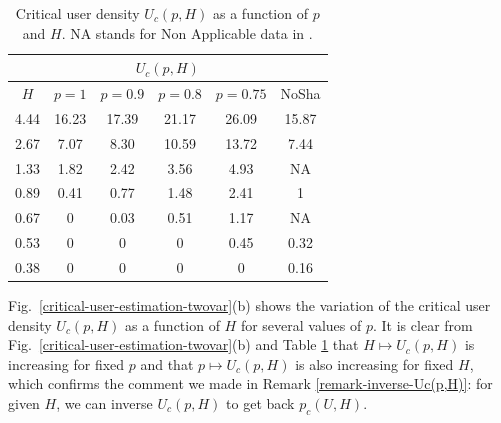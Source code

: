 \documentclass[conference]{IEEEtran}
\begin{document}
\begin{table}[t!]
\caption{Critical user density $U_{c}(p,H)$ as a function of $p$ and $H$. NA stands for Non Applicable data in \cite{cali2018percolation}.} 
\begin{center}
\begin{tabular}{|c|c|c|c|c|c|}
\hline
\multicolumn{6}{|c|}{$U_c(p,H)$}\\
\hline
$H$ & $p=1$ & $p=0.9$ & $p=0.8$ & $p=0.75$ & NoSha \cite{cali2018percolation} \\
\hline
4.44 & 16.23 & 17.39 & 21.17  & 26.09 & 15.87 \\
2.67 & 7.07  & 8.30 & 10.59 & 13.72 &  7.44 \\
1.33 & 1.82 & 2.42 & 3.56 &  4.93 &  NA \\
0.89 & 0.41  & 0.77 & 1.48 & 2.41 &  1  \\
0.67 & 0  & 0.03 & 0.51 &  1.17 &  NA \\
0.53 & 0  & 0 & 0 & 0.45 & 0.32 \\
0.38 & 0 & 0 & 0 & 0 & 0.16 \\
\hline
\end{tabular}
\label{tab-critical-U}
\end{center}
\end{table}

\indent Fig.~\ref{critical-user-estimation-twovar}(b) shows the variation of the critical user density $U_c(p,H)$ as a function of $H$ for several values of $p$. It is clear from Fig.~\ref{critical-user-estimation-twovar}(b) and Table \ref{tab-critical-U} that $H \mapsto U_c(p,H)$ is increasing for fixed $p$ and that $p \mapsto U_c(p,H)$ is also increasing for fixed $H$, which confirms the comment we made in Remark \ref{remark-inverse-Uc(p,H)}: for given $H$, we can inverse $U_c(p,H)$ to get back $p_c(U,H)$.
\end{document}
